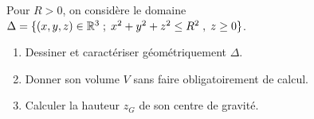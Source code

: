 \documentclass[a4paper]{tp_um}
\begin{document}
\exo{} 
Pour $R>0$, on consid\`ere le domaine $\Delta=\{(x,y,z)\in \mathbb{R}^3\;;\; x^2+y^2+z^2\leq R^2\;,\; z\ge 0\}$.
\begin{enumerate}
\item  Dessiner et caract\'eriser g\'eom\'etriquement $\Delta$.
\item  Donner son volume $V$ sans faire obligatoirement de calcul.
\item Calculer la hauteur $z_G$ de son centre de gravit\'e.%
\end{enumerate}
\end{document}
